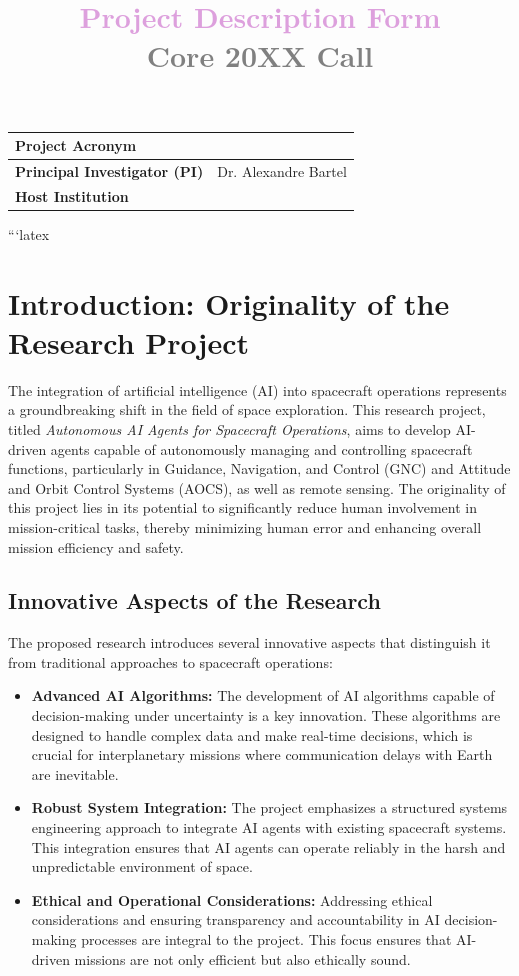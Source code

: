 \documentclass[a4paper, 11pt]{article}
\title{\bf \textcolor{Plum}{Project Description Form} \\ \textcolor{Gray}{Core 20XX Call}}
\author{\vspace{-5ex}}
\date{\vspace{-5ex}}
\begin{document}
\vspace{10cm}
\maketitle

\begin{center}
\begin{tabular}{|p{4.5cm}|p{}|}
\hline
\bf Project Acronym  &  \\ \hline
\bf Principal Investigator (PI)  &  Dr. Alexandre Bartel \\ \hline
\bf Host Institution  & \\ \hline
\end{tabular}
\end{center}

\newpage
```latex
\section{Introduction: Originality of the Research Project}

The integration of artificial intelligence (AI) into spacecraft operations represents a groundbreaking shift in the field of space exploration. This research project, titled \textit{Autonomous AI Agents for Spacecraft Operations}, aims to develop AI-driven agents capable of autonomously managing and controlling spacecraft functions, particularly in Guidance, Navigation, and Control (GNC) and Attitude and Orbit Control Systems (AOCS), as well as remote sensing. The originality of this project lies in its potential to significantly reduce human involvement in mission-critical tasks, thereby minimizing human error and enhancing overall mission efficiency and safety.

\subsection{Innovative Aspects of the Research}

The proposed research introduces several innovative aspects that distinguish it from traditional approaches to spacecraft operations:

\begin{itemize}
    \item \textbf{Advanced AI Algorithms:} The development of AI algorithms capable of decision-making under uncertainty is a key innovation. These algorithms are designed to handle complex data and make real-time decisions, which is crucial for interplanetary missions where communication delays with Earth are inevitable.
    \item \textbf{Robust System Integration:} The project emphasizes a structured systems engineering approach to integrate AI agents with existing spacecraft systems. This integration ensures that AI agents can operate reliably in the harsh and unpredictable environment of space.
    \item \textbf{Ethical and Operational Considerations:} Addressing ethical considerations and ensuring transparency and accountability in AI decision-making processes are integral to the project. This focus ensures that AI-driven missions are not only efficient but also ethically sound.
\end{itemize}
\end{document}
